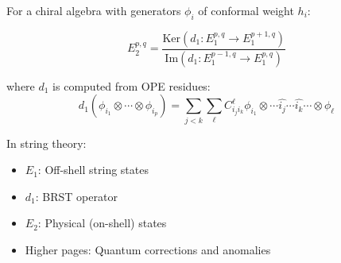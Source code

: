 \begin{example}
For a chiral algebra with generators $\phi_i$ of conformal weight $h_i$:

$$E_2^{p,q} = \frac{\text{Ker}(d_1: E_1^{p,q} \to E_1^{p+1,q})}{\text{Im}(d_1: E_1^{p-1,q} \to E_1^{p,q})}$$

where $d_1$ is computed from OPE residues:
$$d_1(\phi_{i_1} \otimes \cdots \otimes \phi_{i_p}) = \sum_{j<k} \sum_\ell C_{i_j i_k}^\ell \phi_{i_1} \otimes \cdots \widehat{i_j} \cdots \widehat{i_k} \cdots \otimes \phi_\ell$$
\end{example}

\begin{remark}
In string theory:
\begin{itemize}
\item $E_1$: Off-shell string states
\item $d_1$: BRST operator
\item $E_2$: Physical (on-shell) states
\item Higher pages: Quantum corrections and anomalies
\end{itemize}
\end{remark}
